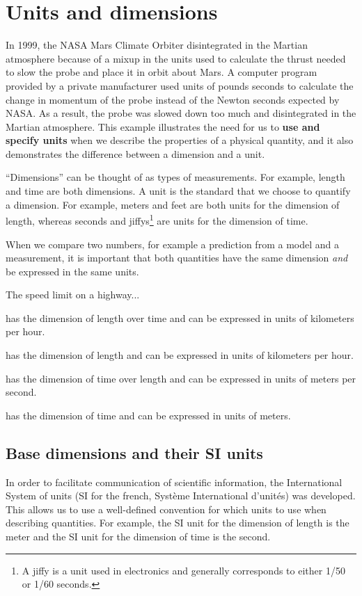 \section{Units and dimensions}
In 1999, the NASA Mars Climate Orbiter disintegrated in the Martian atmosphere because of a mixup in the units used to calculate the thrust needed to slow the probe and place it in orbit about Mars. A computer program provided by a private manufacturer used units of pounds seconds to calculate the change in momentum of the probe instead of the Newton seconds expected by NASA. As a result, the probe was slowed down too much and disintegrated in the Martian atmosphere. This example illustrates the need for us to \textbf{use and specify units} when we describe the properties of a physical quantity, and it also demonstrates the difference between a dimension and a unit.

``Dimensions'' can be thought of as types of measurements. For example, length and time are both dimensions. A unit is the standard that we choose to quantify a dimension. For example, meters and feet are both units for the dimension of length, whereas seconds and jiffys\footnote{A jiffy is a unit used in electronics and generally corresponds to either 1/50 or 1/60 seconds.} are units for the dimension of time.

When we compare two numbers, for example a prediction from a model and a measurement, it is important that both quantities have the same dimension \textit{and} be expressed in the same units.
\begin{checkpoint}
\begin{MCquestion}{The speed limit on a highway...}
\item has the dimension of length over time and can be expressed in units of kilometers per hour. \correct
\item has the dimension of length and can be expressed in units of kilometers per hour.
\item has the dimension of time over length and can be expressed in units of meters per second.
\item has the dimension of time and can be expressed in units of meters.
\end{MCquestion}
\end{checkpoint}

\subsection{Base dimensions and their SI units}
In order to facilitate communication of scientific information, the International System of units (SI for the french, Syst\`eme International d'unit\'es) was developed. This allows us to use a well-defined convention for which units to use when describing quantities. For example, the SI unit for the dimension of length is the meter and the SI unit for the dimension of time is the second.

